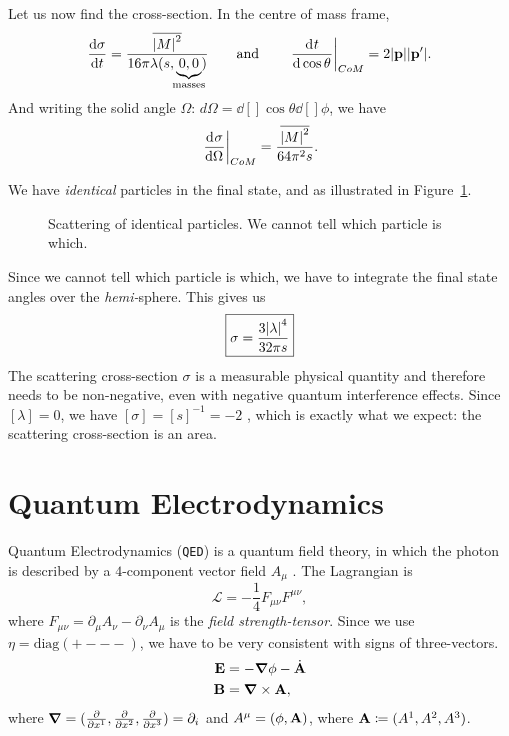Let us now find the cross-section. In the centre of mass frame, 
\begin{equation}
  \dv{\sigma}{t} = \frac{\overline{\abs{M}^2}}{16 \pi \lambda (s, \underbrace{0, 0}_{\mathclap{\text{masses}}})} \qquad \text{and} \qquad \left.\dv[]{t}{\cos\theta}\right\rvert_{CoM} = 2 \abs{\vb{p}} \abs{\vb{p}'}.
\end{equation}
And writing the solid angle $\Omega$: $d\Omega = \dd[]{\cos\theta \dd[]{\phi}}$, we have
\begin{equation}
  \left.\dv[]{\sigma}{\Omega}\right\rvert_{CoM} = \frac{\overline{\abs{M}^2}}{64 \pi^2 s} .
\end{equation}

We have \emph{identical} particles in the final state, and as illustrated in Figure~\ref{fig:l19f1}.
\begin{figure}[tbhp]
  \centering
  \def\svgwidth{0.4\columnwidth}
  
  \caption{Scattering of identical particles. We cannot tell which particle is which.}
  \label{fig:l19f1}
\end{figure}
Since we cannot tell which particle is which, we have to integrate the final state angles over the \emph{hemi-}sphere.
This gives us
\begin{equation}
  \boxed{\sigma = \frac{3 \abs{\lambda}^4}{32 \pi s}}
\end{equation}
The scattering cross-section $\sigma$  is a measurable physical quantity and therefore needs to be non-negative, even with negative quantum interference effects.
Since $[\lambda] = 0$, we have $[\sigma] = [s]^{-1} = -2$ , which is exactly what we expect: the scattering cross-section is an area.

\chapter{Quantum Electrodynamics}%
\label{cha:quantum_electrodynamics}

Quantum Electrodynamics (\texttt{QED}) is a quantum field theory, in which the photon is described by a $4$-component vector field  $A_{\mu}$ . The Lagrangian is
\begin{equation}
  \mathcal{L} = -\frac{1}{4} F_{\mu\nu} F^{\mu\nu},
\end{equation}
where $F_{\mu\nu} = \partial_{\mu} A_{\nu} - \partial_{\nu} A_{\mu}$ is the \emph{field strength-tensor}.
Since we use $\eta = \text{diag}(+ - - -)$, we have to be very consistent with signs of three-vectors.
\begin{align}
  \vb{E} &= - \grad \phi - \dot{\vb{A}} \label{eq:19-1} \\
  \vb{B} &= \grad \times \vb{A}, \label{eq:19-2}
\end{align}
where $\grad = (\frac{\partial }{\partial x^1}, \frac{\partial }{\partial x^2}, \frac{\partial }{\partial x^3}) = \partial_{i}$ and $A^{\mu} = (\phi, \vb{A})$, where $\vb{A} \coloneqq (A^1, A^2, A^3)$.

